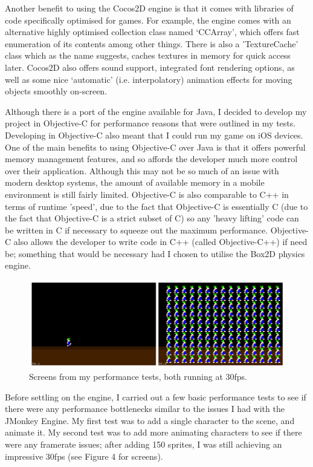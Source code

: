\documentclass[a4paper,oneside]{report}
\begin{document}
Another benefit to using the Cocos2D engine is that it comes with libraries of code specifically optimised for games. For example, the engine comes with an alternative highly optimised collection class named `CCArray', which offers fast enumeration of its contents among other things. There is also a 'TextureCache' class which as the name suggests, caches textures in memory for quick access later. Cocos2D also offers sound support, integrated font rendering options, as well as some nice `automatic' (i.e. interpolatory) animation effects for moving objects smoothly on-screen. 

Although there is a port of the engine available for Java, I decided to develop my project in Objective-C for performance reasons that were outlined in my tests. Developing in Objective-C also meant that I could run my game on iOS devices. One of the main benefits to using Objective-C over Java is that it offers powerful memory management features, and so affords the developer much more control over their application. Although this may not be so much of an issue with modern desktop systems, the amount of available memory in a mobile environment is still fairly limited. Objective-C is also comparable to C++ in terms of runtime 'speed', due to the fact that Objective-C is essentially C (due to the fact that Objective-C is a strict subset of C) so any 'heavy lifting' code can be written in C if necessary to squeeze out the maximum performance. Objective-C also allows the developer to write code in C++ (called Objective-C++) if need be; something that would be necessary had I chosen to utilise the Box2D physics engine.

\begin{figure}[h!]
  \centering
    \includegraphics[width=140mm]{sources/images/InitialTests}
    \caption{Screens from my performance tests, both running at 30fps.}
\end{figure}

Before settling on the engine, I carried out a few basic performance tests to see if there were any performance bottlenecks similar to the issues I had with the JMonkey Engine. My first test was to add a single character to the scene, and animate it. My second test was to add more animating characters to see if there were any framerate issues; after adding 150 sprites, I was still achieving an impressive 30fps (see Figure 4 for screens). 
\end{document}
